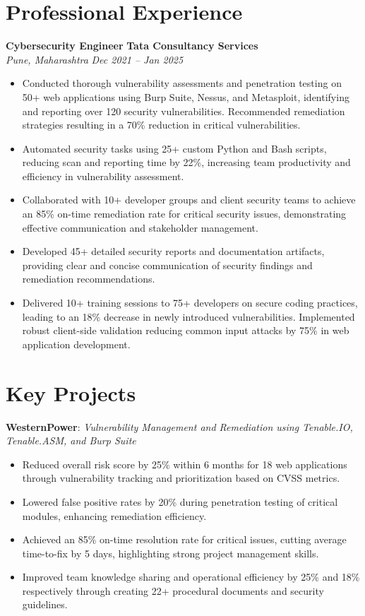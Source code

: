 \documentclass[a4paper,11pt]{article}
\newcommand{\sectiontitle}[1]{\section*{#1}}
\newcommand{\experienceentry}[4]{
\textbf{\textcolor{primary}{#1}} \hfill \textbf{#2} \\
\textit{#3} \hfill \textit{#4} \\
}
\newcommand{\projectentry}[2]{
\raggedright\textbf{\textcolor{primary}{#1}}: \textit{#2} \\
}
\begin{document}
\sectiontitle{Professional Experience}
\experienceentry{Cybersecurity Engineer}{Tata Consultancy Services}{Pune, Maharashtra}{Dec 2021 -- Jan 2025}
\begin{itemize}
\item Conducted thorough vulnerability assessments and penetration testing on 50+ web applications using Burp Suite, Nessus, and Metasploit, identifying and reporting over 120 security vulnerabilities.  Recommended remediation strategies resulting in a 70\% reduction in critical vulnerabilities.
\item Automated security tasks using 25+ custom Python and Bash scripts, reducing scan and reporting time by 22\%, increasing team productivity and efficiency in vulnerability assessment.
\item Collaborated with 10+ developer groups and client security teams to achieve an 85\% on-time remediation rate for critical security issues, demonstrating effective communication and stakeholder management.
\item Developed 45+ detailed security reports and documentation artifacts,  providing clear and concise communication of security findings and remediation recommendations.
\item Delivered 10+ training sessions to 75+ developers on secure coding practices, leading to an 18\% decrease in newly introduced vulnerabilities. Implemented robust client-side validation reducing common input attacks by 75\% in web application development.
\end{itemize}

\sectiontitle{Key Projects}
\projectentry{WesternPower}{Vulnerability Management and Remediation using Tenable.IO, Tenable.ASM, and Burp Suite}
\begin{itemize}
\item Reduced overall risk score by 25\% within 6 months for 18 web applications through vulnerability tracking and prioritization based on CVSS metrics.
\item Lowered false positive rates by 20\% during penetration testing of critical modules, enhancing remediation efficiency.
\item Achieved an 85\% on-time resolution rate for critical issues, cutting average time-to-fix by 5 days, highlighting strong project management skills.
\item Improved team knowledge sharing and operational efficiency by 25\% and 18\% respectively through creating 22+ procedural documents and security guidelines.
\end{itemize}
\end{document}
